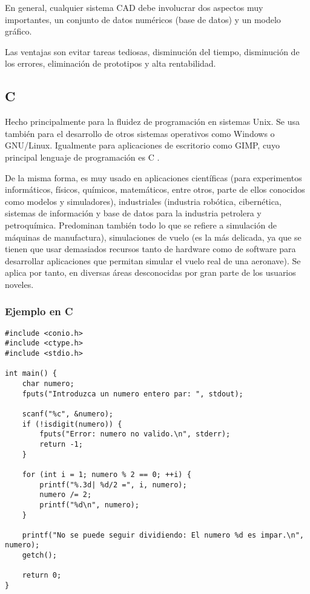 En general, cualquier sistema CAD debe involucrar dos aspectos muy importantes, un conjunto de datos numéricos (base de datos) y un modelo gráfico.

Las ventajas son evitar tareas tediosas, disminución del tiempo, disminución de los errores, eliminación de prototipos y alta rentabilidad.

\subsection{C}

Hecho principalmente para la fluidez de programación en sistemas Unix. Se usa también para el desarrollo de otros sistemas operativos como Windows o GNU/Linux. Igualmente para aplicaciones de escritorio como GIMP, cuyo principal lenguaje de programación es C \autocite{andersen1994program}.

De la misma forma, es muy usado en aplicaciones científicas (para experimentos informáticos, físicos, químicos, matemáticos, entre otros, parte de ellos conocidos como modelos y simuladores), industriales (industria robótica, cibernética, sistemas de información y base de datos para la industria petrolera y petroquímica. Predominan también todo lo que se refiere a simulación de máquinas de manufactura), simulaciones de vuelo (es la más delicada, ya que se tienen que usar demasiados recursos tanto de hardware como de software para desarrollar aplicaciones que permitan simular el vuelo real de una aeronave). Se aplica por tanto, en diversas áreas desconocidas por gran parte de los usuarios noveles.

\subsubsection{Ejemplo en C}

    \begin{lstlisting}[style=cFrameTB, gobble=4]
#include <conio.h>
#include <ctype.h>
#include <stdio.h>

int main() {
    char numero;
    fputs("Introduzca un numero entero par: ", stdout);

    scanf("%c", &numero);
    if (!isdigit(numero)) {
        fputs("Error: numero no valido.\n", stderr);
        return -1;
    }

    for (int i = 1; numero % 2 == 0; ++i) {
        printf("%.3d| %d/2 =", i, numero);
        numero /= 2;
        printf("%d\n", numero);
    }

    printf("No se puede seguir dividiendo: El numero %d es impar.\n", numero);
    getch();

    return 0;
}
    \end{lstlisting}


